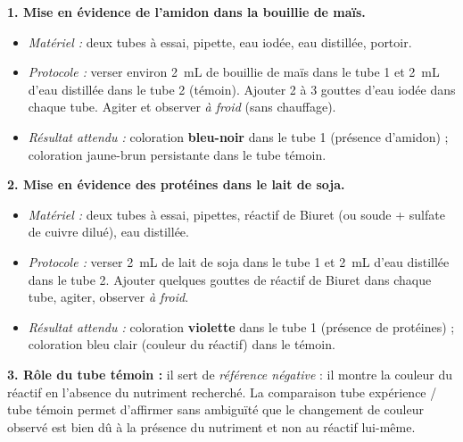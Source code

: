 \documentclass[11pt]{article}
\begin{document}
\begin{corrige}
\textbf{1. Mise en évidence de l'amidon dans la bouillie de maïs.}
\begin{itemize}
\item \emph{Matériel :} deux tubes à essai, pipette, eau iodée, eau distillée, portoir.
\item \emph{Protocole :} verser environ \SI{2}{mL} de bouillie de maïs dans le tube 1 et \SI{2}{mL} d'eau distillée dans le tube 2 (témoin). Ajouter 2 à 3 gouttes d'eau iodée dans chaque tube. Agiter et observer \emph{à froid} (sans chauffage).
\item \emph{Résultat attendu :} coloration \textbf{bleu-noir} dans le tube 1 (présence d'amidon) ; coloration jaune-brun persistante dans le tube témoin.
\end{itemize}

\textbf{2. Mise en évidence des protéines dans le lait de soja.}
\begin{itemize}
\item \emph{Matériel :} deux tubes à essai, pipettes, réactif de Biuret (ou soude + sulfate de cuivre dilué), eau distillée.
\item \emph{Protocole :} verser \SI{2}{mL} de lait de soja dans le tube 1 et \SI{2}{mL} d'eau distillée dans le tube 2. Ajouter quelques gouttes de réactif de Biuret dans chaque tube, agiter, observer \emph{à froid}.
\item \emph{Résultat attendu :} coloration \textbf{violette} dans le tube 1 (présence de protéines) ; coloration bleu clair (couleur du réactif) dans le témoin.
\end{itemize}

\textbf{3. Rôle du tube témoin :} il sert de \emph{référence négative} : il montre la couleur du réactif en l'absence du nutriment recherché. La comparaison tube expérience / tube témoin permet d'affirmer sans ambiguïté que le changement de couleur observé est bien dû à la présence du nutriment et non au réactif lui-même.
\end{corrige}
\end{document}
